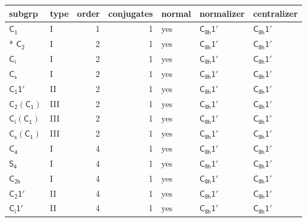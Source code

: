 \documentclass[10pt,a4paper]{article}
\numberwithin{equation}{section}
\newcommand{\grp}[1]{\mathsf{#1}}
\begin{document}
{\small\begin{longtable}{@{}llrrlll@{}}\toprule
subgrp & type & order & conjugates & normal & normalizer & centralizer\\\midrule\endhead
\bottomrule\endfoot\endlastfoot
\href{../../../rotation/data/pdf/C1.pdf}{$\grp{C_{1}}$} & I & 1 & 1 & yes & \href{C8h-1p.pdf}{$\grp{C_{8h}1'}$} & \href{C8h-1p.pdf}{$\grp{C_{8h}1'}$}\\*
\href{../../../rotation/data/pdf/C2.pdf}{$\grp{C_{2}}$} & I & 2 & 1 & yes & \href{C8h-1p.pdf}{$\grp{C_{8h}1'}$} & \href{C8h-1p.pdf}{$\grp{C_{8h}1'}$}\\
\href{../../../rotation/data/pdf/S2.pdf}{$\grp{C_{i}}$} & I & 2 & 1 & yes & \href{C8h-1p.pdf}{$\grp{C_{8h}1'}$} & \href{C8h-1p.pdf}{$\grp{C_{8h}1'}$}\\
\href{../../../rotation/data/pdf/C1v.pdf}{$\grp{C_{s}}$} & I & 2 & 1 & yes & \href{C8h-1p.pdf}{$\grp{C_{8h}1'}$} & \href{C8h-1p.pdf}{$\grp{C_{8h}1'}$}\\
\href{C1-1p.pdf}{$\grp{C_{1}1'}$} & II & 2 & 1 & yes & \href{C8h-1p.pdf}{$\grp{C_{8h}1'}$} & \href{C8h-1p.pdf}{$\grp{C_{8h}1'}$}\\
\href{C2-C1.pdf}{$\grp{C_{2}}(\grp{C_{1}})$} & III & 2 & 1 & yes & \href{C8h-1p.pdf}{$\grp{C_{8h}1'}$} & \href{C8h-1p.pdf}{$\grp{C_{8h}1'}$}\\
\href{S2-C1.pdf}{$\grp{C_{i}}(\grp{C_{1}})$} & III & 2 & 1 & yes & \href{C8h-1p.pdf}{$\grp{C_{8h}1'}$} & \href{C8h-1p.pdf}{$\grp{C_{8h}1'}$}\\
\href{C1v-C1.pdf}{$\grp{C_{s}}(\grp{C_{1}})$} & III & 2 & 1 & yes & \href{C8h-1p.pdf}{$\grp{C_{8h}1'}$} & \href{C8h-1p.pdf}{$\grp{C_{8h}1'}$}\\
\href{../../../rotation/data/pdf/C4.pdf}{$\grp{C_{4}}$} & I & 4 & 1 & yes & \href{C8h-1p.pdf}{$\grp{C_{8h}1'}$} & \href{C8h-1p.pdf}{$\grp{C_{8h}1'}$}\\
\href{../../../rotation/data/pdf/S4.pdf}{$\grp{S_{4}}$} & I & 4 & 1 & yes & \href{C8h-1p.pdf}{$\grp{C_{8h}1'}$} & \href{C8h-1p.pdf}{$\grp{C_{8h}1'}$}\\
\href{../../../rotation/data/pdf/C2h.pdf}{$\grp{C_{2h}}$} & I & 4 & 1 & yes & \href{C8h-1p.pdf}{$\grp{C_{8h}1'}$} & \href{C8h-1p.pdf}{$\grp{C_{8h}1'}$}\\
\href{C2-1p.pdf}{$\grp{C_{2}1'}$} & II & 4 & 1 & yes & \href{C8h-1p.pdf}{$\grp{C_{8h}1'}$} & \href{C8h-1p.pdf}{$\grp{C_{8h}1'}$}\\
\href{S2-1p.pdf}{$\grp{C_{i}1'}$} & II & 4 & 1 & yes & \href{C8h-1p.pdf}{$\grp{C_{8h}1'}$} & \href{C8h-1p.pdf}{$\grp{C_{8h}1'}$}\\

\end{longtable}}
\end{document}
